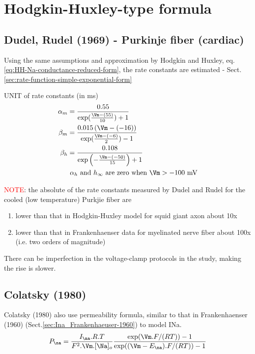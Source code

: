 \section{Hodgkin-Huxley-type formula}
\label{sec:Hodgkin-Huxley-Na-models-cardiac}


\subsection{Dudel, Rudel (1969) - Purkinje fiber (cardiac)}
\label{sec:Ina_Dudel-Rudel-1969-Purkinje-fiber}

Using the same assumptions and approximation by Hodgkin and Huxley,
eq.\ref{eq:HH-Na-conductance-reduced-form},  the rate constants are estimated -
Sect.\ref{sec:rate-function-simple-exponential-form}

UNIT of rate constants (in ms) 
\begin{equation}
\begin{split}
\alpha_m &= \frac{0.55}{\exp(\frac{\Vm - (55)}{10}) + 1} \\
\beta_m &= \frac{0.015 \left( \Vm - (-16) \right)}{\exp(\frac{\Vm - (-6)}{2})
- 1} \\
\beta_h &= \frac{0.108}{\exp\left(- \frac{\Vm - (-50)}{15}\right) + 1 } \\
& \text{ $\alpha_h$ and $h_\infty$ are zero when $\Vm > -100$ mV}
\end{split}
\end{equation}

\textcolor{red}{NOTE}: the absolute of the rate constants measured by Dudel
and Rudel for the cooled (low temperature) Purkjie fiber are
\begin{enumerate}
  \item lower than that in Hodgkin-Huxley
  model for squid giant axon about 10x
  \item lower than that in Frankenhaenser data for myelinated nerve fiber about
  100x (i.e. two orders of magnitude)
\end{enumerate}
There can be imperfection in the voltage-clamp protocols in the study, making
the rise is slower. 

\subsection{Colatsky (1980)}
\label{sec:Ina_Colatsky-1980}

Colatsky (1980) also use permeability formula, similar to that in Frankenhaenser
(1960) (Sect.\ref{sec:Ina_Frankenhaeuser-1960}) to model INa. 
\begin{equation}
P_\na= \frac{I_\na. R.T}{F^2 . \Vm . [\Na]_o}
\frac{\exp(\Vm.F/(RT)) - 1}{\exp((\Vm-E_\na).F/(RT)) - 1}
\end{equation}


